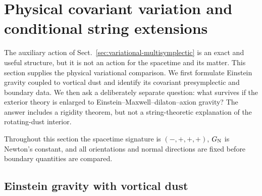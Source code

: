 \section{Physical covariant variation and conditional string extensions}
\label{sec:physical-variational-string}

The auxiliary action of Sect.~\ref{sec:variational-multisymplectic} is an
exact and useful structure, but it is not an action for the spacetime and
its matter. This section supplies the physical variational comparison. We
first formulate Einstein gravity coupled to vortical dust and identify its
covariant presymplectic and boundary data. We then ask a deliberately
separate question: what survives if the exterior theory is enlarged to
Einstein--Maxwell--dilaton--axion gravity? The answer includes a rigidity
theorem, but not a string-theoretic explanation of the rotating-dust
interior.

Throughout this section the spacetime signature is $(-,+,+,+)$,
$G_{\rm N}$ is Newton's constant, and all orientations and normal directions
are fixed before boundary quantities are compared.

\subsection{Einstein gravity with vortical dust}

